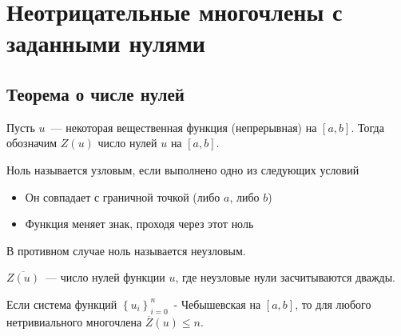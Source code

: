 \section{Неотрицательные многочлены с заданными нулями}
\subsection{Теорема о числе нулей}
\begin{dfn}
Пусть $u$ — некоторая вещественная функция (непрерывная) на $[a,b]$.
Тогда обозначим $Z(u)$ число нулей $u$ на $[a,b]$.
\end{dfn}

\begin{dfn}
Ноль называется узловым, если выполнено одно из следующих условий
\begin{itemize}
\item Он совпадает с граничной точкой (либо $a$, либо $b$)
\item Функция меняет знак, проходя через этот ноль
\end{itemize}
В противном случае ноль называется неузловым.
\end{dfn}

\begin{dfn}
$\overline{Z(u)}$ — число нулей функции $u$, где неузловые нули засчитываются дважды.
\end{dfn}

\begin{thm}
\label{zeroThm}
Если система функций $\left\{ u_i\right\}_{i=0}^{n}$ - Чебышевская на $[a,b]$,  то для любого нетривиального многочлена $\overline{Z}(u) \leq n$.
\end{thm}

